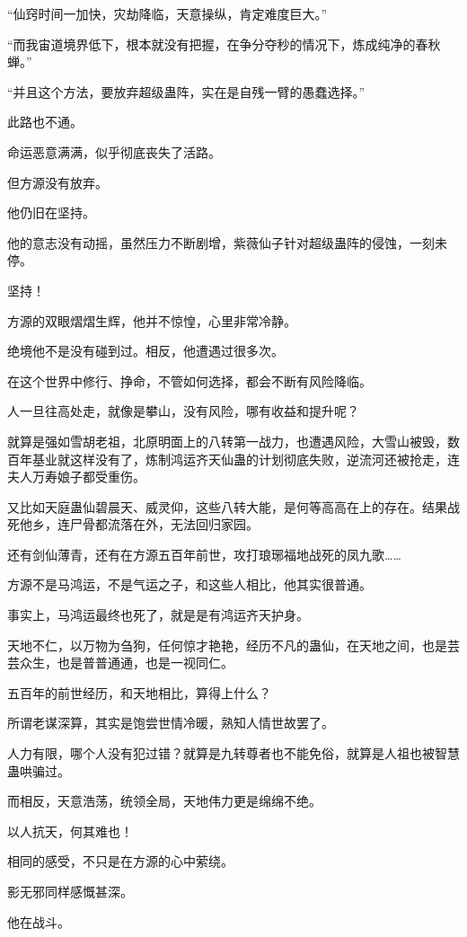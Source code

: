 \begin{this_body}
“仙窍时间一加快，灾劫降临，天意操纵，肯定难度巨大。”

“而我宙道境界低下，根本就没有把握，在争分夺秒的情况下，炼成纯净的春秋蝉。”

“并且这个方法，要放弃超级蛊阵，实在是自残一臂的愚蠢选择。”

此路也不通。

命运恶意满满，似乎彻底丧失了活路。

但方源没有放弃。

他仍旧在坚持。

他的意志没有动摇，虽然压力不断剧增，紫薇仙子针对超级蛊阵的侵蚀，一刻未停。

坚持！

方源的双眼熠熠生辉，他并不惊惶，心里非常冷静。

绝境他不是没有碰到过。相反，他遭遇过很多次。

在这个世界中修行、挣命，不管如何选择，都会不断有风险降临。

人一旦往高处走，就像是攀山，没有风险，哪有收益和提升呢？

就算是强如雪胡老祖，北原明面上的八转第一战力，也遭遇风险，大雪山被毁，数百年基业就这样没有了，炼制鸿运齐天仙蛊的计划彻底失败，逆流河还被抢走，连夫人万寿娘子都受重伤。

又比如天庭蛊仙碧晨天、威灵仰，这些八转大能，是何等高高在上的存在。结果战死他乡，连尸骨都流落在外，无法回归家园。

还有剑仙薄青，还有在方源五百年前世，攻打琅琊福地战死的凤九歌……

方源不是马鸿运，不是气运之子，和这些人相比，他其实很普通。

事实上，马鸿运最终也死了，就是是有鸿运齐天护身。

天地不仁，以万物为刍狗，任何惊才艳艳，经历不凡的蛊仙，在天地之间，也是芸芸众生，也是普普通通，也是一视同仁。

五百年的前世经历，和天地相比，算得上什么？

所谓老谋深算，其实是饱尝世情冷暖，熟知人情世故罢了。

人力有限，哪个人没有犯过错？就算是九转尊者也不能免俗，就算是人祖也被智慧蛊哄骗过。

而相反，天意浩荡，统领全局，天地伟力更是绵绵不绝。

以人抗天，何其难也！

相同的感受，不只是在方源的心中萦绕。

影无邪同样感慨甚深。

他在战斗。


\end{this_body}
